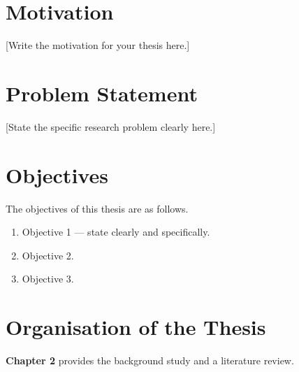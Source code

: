 \section{Motivation}
\label{sec:motivation}


[Write the motivation for your thesis here.]

\section{Problem Statement}
\label{sec:problem_statement}


[State the specific research problem clearly here.]

\section{Objectives}
\label{sec:objectives}

The objectives of this thesis are as follows.

\begin{enumerate}
  \item Objective 1 — state clearly and specifically.
  \item Objective 2.
  \item Objective 3.
\end{enumerate}

\section{Organisation of the Thesis}
\label{sec:organisation}


\textbf{Chapter 2} provides the background study and a literature review.

